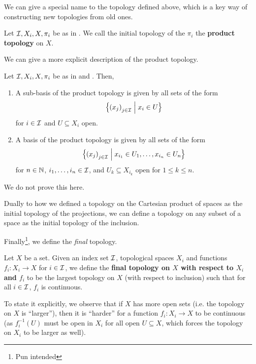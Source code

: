 We can give a special name to the topology defined above, which is a key way of constructing new topologies from old ones.

\begin{boxdefinition}\label{Ch1:Def:Prod_Top}
    Let $\mathcal{I}, X_i, X, \pi_i$ be as in . We call the initial topology of the $\pi_i$ the \textbf{product topology} on $X$.
\end{boxdefinition}

We can give a more explicit description of the product topology.

\begin{boxproposition}
    Let $\mathcal{I}, X_i, X, \pi_i$ be as in  and . Then,
    \begin{enumerate}
        \item A sub-basis of the product topology is given by all sets of the form
        \begin{align*}
            \left\{ \left( x_j \right)_{j \in \mathcal{I}} \; \middle\vert \; x_i \in U \right\}
        \end{align*}
        for $i \in \mathcal{I}$ and $U \subseteq X_i$ open.

        \item A basis of the product topology is given by all sets of the form
        \begin{align*}
            \left\{ \left( x_j \right)_{j \in \mathcal{I}} \; \middle\vert \; x_{i_1} \in U_1, \ldots, x_{i_n} \in U_n \right\}
        \end{align*}
        for $n \in \mathbb{N}$, $i_1, \ldots, i_n \in \mathcal{I}$, and $U_k \subseteq X_{i_k}$ open for $1 \leq k \leq n$.
    \end{enumerate}
\end{boxproposition}

We do not prove this here.

Dually to how we defined a topology on the Cartesian product of spaces as the initial topology of the projections, we can define a topology on any subset of a space as the initial topology of the inclusion.

Finally\footnote{Pun intended}, we define the \textit{final} topology.

\begin{boxdefinition}\label{Ch1:Def:Final_Top}
    Let $X$ be a set. Given an index set $\mathcal{I}$, topological spaces $X_i$ and functions $f_i : X_i \to X$ for $i \in \mathcal{I}$, we define the \textbf{final topology on $X$ with respect to $X_i$ and $f_i$} to be the largest topology on $X$ (with respect to inclusion) such that for all $i \in \mathcal{I}$, $f_i$ is continuous.
\end{boxdefinition}
\begin{remark}
    To state it explicitly, we observe that if $X$ has more open sets (i.e. the topology on $X$ is ``larger''), then it is ``harder'' for a function $f_i:X_i\to X$ to be continuous (as $f_i^{-1}(U)$ must be open in $X_i$ for all open $U\subseteq X$, which forces the topology on $X_i$ to be larger as well).
\end{remark} %

